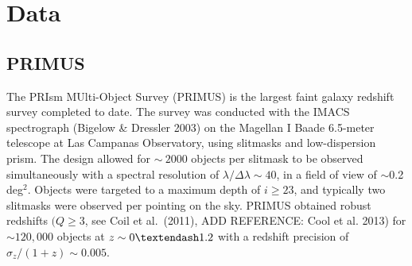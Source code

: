 
\section{Data}\label{sec:data}


\subsection{PRIMUS}\label{sec:PRIMUS}
 
The PRIsm MUlti-Object Survey (PRIMUS) is the largest faint galaxy redshift survey completed to date.
The survey was conducted with the IMACS spectrograph (Bigelow \& Dressler 2003) on the Magellan I Baade 6.5-meter telescope at Las Campanas Observatory, using slitmasks and low-dispersion prism.
The design allowed for $\sim~2000$ objects per slitmask to be observed simultaneously with a spectral resolution of ${\lambda/\Delta\lambda \sim 40}$, in a field of view of $\sim$0.2 deg$^2$.
Objects were targeted to a maximum depth of ${i \ge 23}$, and typically two slitmasks were observed per pointing on the sky.  
PRIMUS obtained robust redshifts $({Q \ge 3}$, see Coil et al.~(2011), ADD REFERENCE:  Cool et al. 2013) for $\sim120,000$ objects at ${z \sim 0\textendash1.2}$ with a redshift precision of ${\sigma_{z}/(1 + z) \sim 0.005}$.


